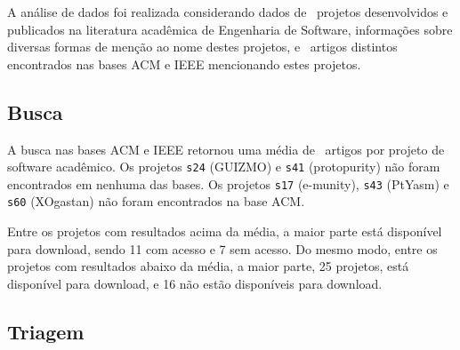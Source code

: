 A análise de dados foi realizada considerando
dados de \SoftwareCount \ projetos desenvolvidos e publicados na literatura
acadêmica de Engenharia de Software, informações sobre diversas formas de
menção ao nome destes projetos, e \ScreeningUniqueCount \ artigos distintos
encontrados nas bases ACM e IEEE mencionando estes projetos.

\subsection{Busca}

A busca nas bases ACM e IEEE retornou uma média de \SearchUniqueMean \ artigos
por projeto de software acadêmico. 
Os projetos \texttt{s24} (GUIZMO) e \texttt{s41} (protopurity)
não foram encontrados em nenhuma das bases.
Os projetos \texttt{s17} (e-munity), \texttt{s43} (PtYasm) e \texttt{s60} (XOgastan)
não foram encontrados na base ACM.

Entre os projetos com resultados acima da média, 
a maior parte está disponível para download, 
sendo 11 com acesso e 7 sem acesso.  
Do mesmo modo, entre os projetos com resultados abaixo da média, 
a maior parte, 25 projetos, está disponível para download, 
e 16 não estão disponíveis para download.



\subsection{Triagem}

